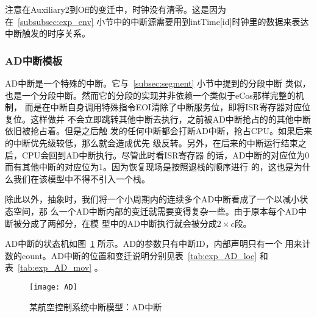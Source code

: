 注意在Auxiliary2到Off的变迁中，时钟没有清零。这是因为在~\ref{subsubsec:exp_env} 
小节中的中断源需要用到intTime[id]时钟里的数据来表达中断触发的时序关系。

\subsubsection{AD中断模板}
\label{subsubsec:exp_ad}

AD中断是一个特殊的中断。它与~\ref{subsec:segment} 小节中提到的分段中断
类似，也是一个分段中断。然而它的分段的实现并非依赖一个类似于eCos那样完整的机制，
而是在中断自身调用特殊指令EOI清除了中断服务位，即将ISR寄存器对应位复位。这样做并
不会立即跳转其他中断去执行，之前被AD中断抢占的的其他中断依旧被抢占着。但是之后触
发的任何中断都会打断AD中断，抢占CPU。如果后来的中断优先级较低，那么就会造成优先
级反转。另外，在后来的中断运行结束之后，CPU会回到AD中断执行。尽管此时看ISR寄存器
的话，AD中断的对应位为0而有其他中断的对应位为1。因为恢复现场是按照退栈的顺序进行
的，这也是为什么我们在该模型中不得不引入一个栈。

除此以外，抽象时，我们将一个小周期内的连续多个AD中断看成了一个以减小状态空间，那
么一个AD中断内部的变迁就需要变得复杂一些。由于原本每个AD中断被分成了两部分，在模
型中的AD中断执行就会被分成$2\times c$段。

AD中断的状态机如图~\ref{fig:exp_AD} 所示。AD的参数只有中断ID，内部声明只有一个
用来计数的count。AD中断的位置和变迁说明分别见表~\ref{tab:exp_AD_loc} 和
表~\ref{tab:exp_AD_mov} 。

\begin{figure}[H]
	\centering
	\texttt{[image: AD]}
	\caption{某航空控制系统中断模型：AD中断}
	\label{fig:exp_AD}
\end{figure}

